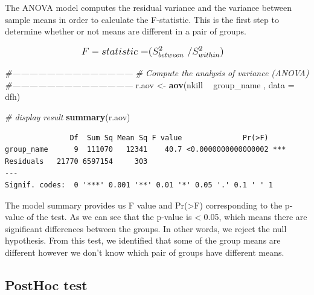 \documentclass[11pt,oneside,a4paper]{reedthesis}
\newenvironment{Shaded}{\begin{snugshade}}{\end{snugshade}}
\newcommand{\KeywordTok}[1]{\textcolor[rgb]{0.13,0.29,0.53}{\textbf{#1}}}
\newcommand{\DataTypeTok}[1]{\textcolor[rgb]{0.13,0.29,0.53}{#1}}
\newcommand{\StringTok}[1]{\textcolor[rgb]{0.31,0.60,0.02}{#1}}
\newcommand{\CommentTok}[1]{\textcolor[rgb]{0.56,0.35,0.01}{\textit{#1}}}
\newcommand{\OperatorTok}[1]{\textcolor[rgb]{0.81,0.36,0.00}{\textbf{#1}}}
\newcommand{\NormalTok}[1]{#1}
\begin{document}
The ANOVA model computes the residual variance and the variance between
sample means in order to calculate the F-statistic. This is the first
step to determine whether or not means are different in a pair of
groups.

\[
\large
\begin{aligned}
F-statistic = & (S^2_{between}\ / S^2_{within})
\end{aligned}
\]
\begin{Shaded}
\begin{Highlighting}[]
\CommentTok{#------------------------------------------}
\CommentTok{# Compute the analysis of variance (ANOVA)}
\CommentTok{#------------------------------------------}
\NormalTok{r.aov <-}\StringTok{ }\KeywordTok{aov}\NormalTok{(nkill }\OperatorTok{~}\StringTok{ }\NormalTok{group_name , }\DataTypeTok{data =}\NormalTok{ dfh)}

\CommentTok{# display result}
\KeywordTok{summary}\NormalTok{(r.aov)}
\end{Highlighting}
\end{Shaded}
\begin{verbatim}
               Df  Sum Sq Mean Sq F value              Pr(>F)    
group_name      9  111070   12341    40.7 <0.0000000000000002 ***
Residuals   21770 6597154     303                                
---
Signif. codes:  0 '***' 0.001 '**' 0.01 '*' 0.05 '.' 0.1 ' ' 1
\end{verbatim}
The model summary provides us F value and Pr(\textgreater{}F)
corresponding to the p-value of the test. As we can see that the p-value
is \textless{} 0.05, which means there are significant differences
between the groups. In other words, we reject the null hypothesis. From
this test, we identified that some of the group means are different
however we don't know which pair of groups have different means.

\subsection{PostHoc test}\label{posthoc-test}
\end{document}

